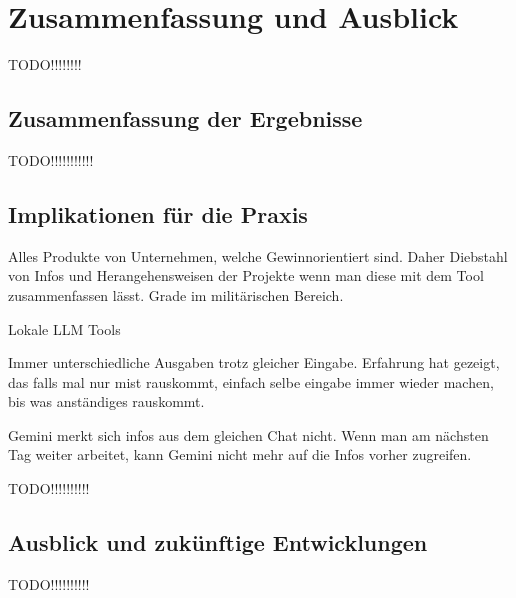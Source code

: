 
\chapter{Zusammenfassung und Ausblick} 

TODO!!!!!!!!

\section{Zusammenfassung der Ergebnisse}  \label{Zusammenfassung der Ergebnisse}

TODO!!!!!!!!!!!

\section{Implikationen für die Praxis}  \label{Implikationen für die Praxis}

Alles Produkte von Unternehmen, welche Gewinnorientiert sind. Daher Diebstahl von Infos und Herangehensweisen der Projekte 
wenn man diese mit dem Tool zusammenfassen lässt. Grade im militärischen Bereich.

Lokale LLM Tools

Immer unterschiedliche Ausgaben trotz gleicher Eingabe. Erfahrung hat gezeigt, das falls mal nur mist rauskommt, einfach selbe eingabe 
immer wieder machen, bis was anständiges rauskommt.

Gemini merkt sich infos aus dem gleichen Chat nicht. Wenn man am nächsten Tag weiter arbeitet, kann Gemini nicht mehr auf die Infos vorher 
zugreifen.

TODO!!!!!!!!!!

\section{Ausblick und zukünftige Entwicklungen}  \label{Ausblick und zukünftige Entwicklungen}

TODO!!!!!!!!!!